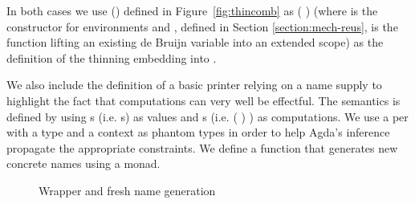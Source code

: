 In both cases we use () defined in Figure~\ref{fig:thincomb} as
( ) (where  is the constructor for environments and
, defined in Section \ref{section:mech-reus}, is the function lifting an
existing de Bruijn variable into an extended scope) as the definition of the
thinning embedding \AB{$\Gamma$} into {\AB{$\sigma$} \AIC{::} \AB{$\Gamma$}}.

\label{section:printing}
We also include the definition of a basic printer relying on a name supply
to highlight the fact that computations can very well be effectful.
The  semantics is defined by using s (i.e. s)
as values and s (i.e. { ( ) })
as computations. We use a per with a type and a context as phantom types
in order to help Agda's inference propagate the appropriate constraints. We define
a function  that generates new concrete names using a  monad.

\begin{figure}[h]
\begin{minipage}{0.6\textwidth}
\end{minipage}
\begin{minipage}{0.3\textwidth}
\end{minipage}

\begin{minipage}{0.45\textwidth}
\end{minipage}
\begin{minipage}{0.45\textwidth}
\end{minipage}
\caption{Wrapper and fresh name generation}\label{fig:fresh}
\end{figure}


